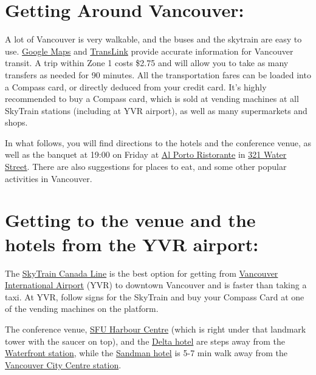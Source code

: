 \documentclass[letterpaper,12pt]{article}
\begin{document}
\section*{Getting Around Vancouver:}

A lot of Vancouver is very walkable, and the buses and the skytrain are easy to use. \href{https://bit.ly/2DsKc3N}{Google Maps} and \href{http://www.translink.ca}{TransLink} provide accurate information for Vancouver transit.  A trip within Zone 1 costs \$2.75 and will allow you to take as many transfers as needed for 90 minutes. All the transportation fares can be loaded into a Compass card, or directly deduced from your credit card. It's highly recommended to buy a Compass card, which is sold at vending machines at all SkyTrain stations (including at YVR airport), as well as many supermarkets and shops.

In what follows, you will find directions to the hotels and the conference venue, as well as the banquet at 19:00 on Friday at \href{http://www.alporto.ca}{Al Porto Ristorante} in \href{https://tinyurl.com/yasn4eqo}{321 Water Street}. There are also suggestions for places to eat, and some other popular activities in Vancouver.

\section*{Getting to the venue and the hotels from the YVR airport:}

The \href{http://www.translink.ca/en/Schedules-and-Maps/SkyTrain/SkyTrain-Schedules/Canada-Line.aspx}{SkyTrain Canada Line} is the best option for getting from \href{http://www.yvr.ca/en/passengers}{Vancouver International Airport} (YVR) to downtown Vancouver and is faster than taking a taxi. At YVR, follow signs for the SkyTrain and buy your Compass Card at one of the vending machines on the platform.

The conference venue, \href{https://www.sfu.ca/mecs/facilities/harbour-centre.html}{SFU Harbour Centre} (which is right under that landmark tower with the saucer on top), and the \href{http://www.marriott.com/hotels/travel/yvrdv-delta-vancouver-suites/}{Delta hotel} are steps away from the \href{http://infomaps.translink.ca/System_Maps/skytrain_station_maps/waterfront_station.pdf}{Waterfront station}, while the \href{https://www.sandmanhotels.com/locations/british-columbia/vancouver/hotels/vancouver-city-centre-vcc?property=VCC&adults=2&children=0&dates=2017-01-24_2017-01-29&groupCode=912299&fromSearch=1&currency=CAD}{Sandman hotel} is 5-7 min walk away from the \href{http://infomaps.translink.ca/System_Maps/skytrain_station_maps/granville_vancouver_city_centre_station.pdf}{Vancouver City Centre station}.
\end{document}
